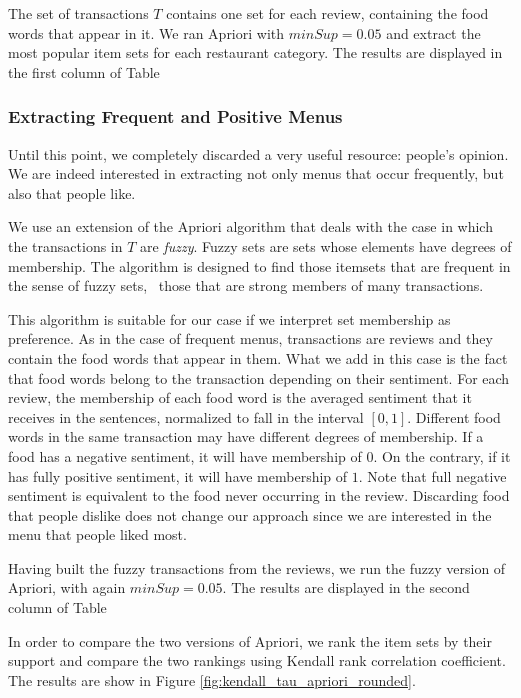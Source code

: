 The set of transactions $T$ contains one set for each review, containing the food words that appear in it. 
We ran Apriori with $minSup = 0.05$ and extract the most popular item sets for each restaurant category.
The results are displayed in the first column of Table 

\subsubsection{Extracting Frequent and Positive Menus}
Until this point, we completely discarded a very useful resource: people's opinion. We are indeed interested in extracting not only menus that occur frequently, but also that people like.

We use an extension of the Apriori algorithm \cite{delgado2003fuzzy} that deals with the case in which the transactions in $T$ are \emph{fuzzy}. Fuzzy sets are sets whose elements have degrees of membership.
The algorithm is designed to find those itemsets that are frequent in the sense of fuzzy sets, \ie\ those that are strong members of many transactions.

This algorithm is suitable for our case if we interpret set membership as preference. As in the case of frequent menus, transactions are reviews and they contain the food words that appear in them. What we add in this case is the fact that food words belong to the transaction depending on their sentiment.
For each review, the membership of each food word is the averaged sentiment that it receives in the sentences, normalized to fall in the interval $[0,1]$. Different food words in the same transaction may have different degrees of membership. If a food has a negative sentiment, it will have membership of $0$. On the contrary, if it has fully positive sentiment, it will have membership of $1$. 
Note that full negative sentiment is equivalent to the food never occurring in the review. Discarding food that people dislike does not change our approach since we are interested in the menu that people liked most.

Having built the fuzzy transactions from the reviews, we run the fuzzy version of Apriori, with again $minSup = 0.05$.
The results are displayed in the second column of Table 


In order to compare the two versions of Apriori, we rank the item sets by their support and compare the two rankings using Kendall rank correlation coefficient. The results are show in Figure \ref{fig:kendall_tau_apriori_rounded}.


